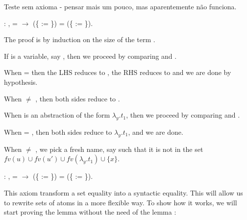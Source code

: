  Teste sem axioma - pensar mais um pouco, mas aparentemente não funciona. 
\begin{coqdoccode}
\coqdocemptyline
\coqdocnoindent
{} : \coqdockw{\ensuremath{\forall}}    ,  =  \ensuremath{\rightarrow} (\{ := \}) = (\{ := \}).\coqdoceol
\end{coqdoccode}
 The proof is by induction on the size of the term .
\begin{coqdoccode}
\end{coqdoccode}
If  is a variable, say , then we proceed by comparing  and .\begin{coqdoccode}
 \end{coqdoccode}
When  =  then the LHS reduces to , the RHS reduces to  and we are done by hypothesis. 
\begin{coqdoccode}
\end{coqdoccode}
When  \ensuremath{\not=} , then both sides reduce to . 
\begin{coqdoccode}
\end{coqdoccode}
When  is an abstraction of the form $\lambda_y.t_1$, then we proceed by comparing  and .\begin{coqdoccode}
 \end{coqdoccode}
When  = , then both sides reduce to $\lambda_y.t_1$, and we are done.
\begin{coqdoccode}
\end{coqdoccode}
When  \ensuremath{\not=} , we pick a fresh name, say  such that it is not in the set $fv(u) \cup fv(u') \cup fv(\lambda_y.t_1) \cup \{x\}$.\begin{coqdoccode}
 \coqdocemptyline
\coqdocnoindent
{} : \coqdockw{\ensuremath{\forall}}    ,  =  \ensuremath{\rightarrow} (\{ := \}) = (\{ := \}).\coqdoceol
\coqdocemptyline
\end{coqdoccode}
This axiom transform a set equality into a syntactic equality. This will allow us to rewrite sets of atoms in a more flexible way. To show how it works, we will start proving the lemma  without the need of the lemma :
